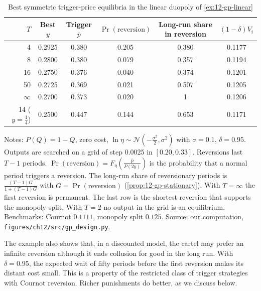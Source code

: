 \begin{table}[htbp]
\centering
\caption{Best symmetric trigger-price equilibria in the linear duopoly of \cref{ex:12-gp-linear}}\label{tab:12-gp-example}
\begin{tabular}{@{}rccccc@{}}
\toprule
$T$ & Best $y$ & Trigger $\bar p$ & $\Pr(\text{reversion})$ & Long-run share in reversion & $(1 - \delta)V_i$ \\
\midrule
4      & 0.2925 & 0.380 & 0.205 & 0.380 & 0.1177 \\
8      & 0.2800 & 0.380 & 0.079 & 0.357 & 0.1194 \\
16     & 0.2750 & 0.376 & 0.040 & 0.374 & 0.1201 \\
50     & 0.2725 & 0.369 & 0.021 & 0.507 & 0.1205 \\
$\infty$ & 0.2700 & 0.373 & 0.020 & 1     & 0.1206 \\
\midrule
14 ($y = \frac{1}{4}$) & 0.2500 & 0.447 & 0.144 & 0.653 & 0.1171 \\
\bottomrule
\end{tabular}

\smallskip
\begin{minipage}{0.95\textwidth}
\footnotesize Notes: $P(Q) = 1 - Q$, zero cost, $\ln\eta \sim \mathcal{N}(-\frac{\sigma^2}{2}, \sigma^2)$ with
$\sigma = 0.1$, $\delta = 0.95$. Outputs are searched on a grid of step 0.0025 in $[0.20, 0.33]$. Reversions last
$T - 1$ periods. $\Pr(\text{reversion}) = F_\eta(\frac{\bar p}{P(2y)})$ is the probability that a normal period
triggers a reversion. The long-run share of reversionary periods is $\frac{(T-1)G}{1 + (T-1)G}$ with
$G = \Pr(\text{reversion})$ (\cref{prop:12-gp-stationary}). With $T = \infty$ the first reversion is permanent. The
last row is the shortest reversion that supports the monopoly split. With $T = 2$ no output in the grid is an
equilibrium. Benchmarks: Cournot $0.1111$, monopoly split $0.125$. Source: our computation,
\texttt{figures/ch12/src/gp\_design.py}.
\end{minipage}
\end{table}

The example also shows that, in a discounted model, the cartel may prefer an infinite reversion although it ends
collusion for good in the long run. With $\delta = 0.95$, the expected wait of fifty periods before the first
reversion makes its distant cost small. This is a property of the restricted class of trigger strategies with
Cournot reversion. Richer punishments do better, as we discuss below.

